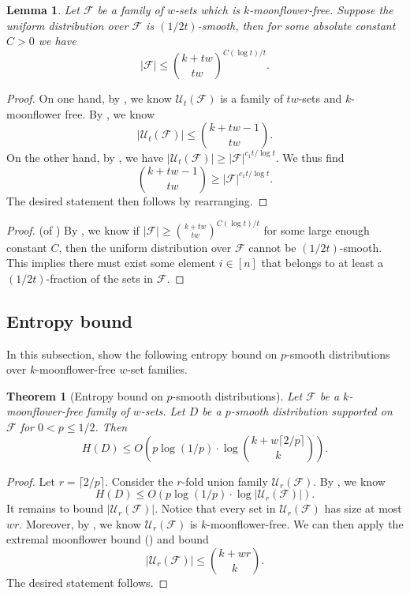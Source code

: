 \documentclass{article}
\newtheorem{theorem}{Theorem}[section]
\newtheorem{lemma}[lemma]{Lemma}
\newcommand{\<}{\langle}
\renewcommand{\>}{\rangle}
\newcommand{\calF}{\mathcal{F}}
\newcommand{\calU}{\mathcal{U}}
\begin{document}
\begin{lemma}\label{lem:smooth_uniform_implies_small_family_size}
    Let $\calF$ be a family of $w$-sets which is $k$-moonflower-free. Suppose the uniform distribution over $\calF$ is $(1/2t)$-smooth, then for some absolute constant $C>0$ we have 
    \[
    |\calF| \le {\binom{k+tw}{tw}}^{C (\log t)/t}.
    \]
\end{lemma}
\begin{proof}
    On one hand, by , we know $\calU_t(\calF)$ is a family of $tw$-sets and $k$-moonflower free. By , we know 
    \[
    |\calU_t (\calF)| \leq \binom{k+tw-1}{tw}.
    \] On the other hand, by , we have $|\calU_t (\calF)| \geq |\calF|^{c_1t / \log t}$. We thus find
    \[
    \binom{k+tw-1}{tw}  \geq |\calF|^{c_1t / \log t}.
    \]
    The desired statement then follows by rearranging.
\end{proof}

\begin{proof}
    (of ) By , we know if $|\calF| \ge {\binom{k+tw}{tw}}^{C (\log t)/t}$ for some large enough constant $C$, then the uniform distribution over $\calF$ cannot be $(1/2t)$-smooth. This implies there must exist some element $i \in [n]$ that belongs to at least a $(1/2t)$-fraction of the sets in $\calF$. 
\end{proof}

\subsection{Entropy bound}\label{subsec:universe_reduction}

In this subsection, show the following entropy bound on $p$-smooth distributions over $k$-moonflower-free $w$-set families.

\begin{theorem}[Entropy bound on $p$-smooth distributions]\label{thm:ent_bnd_p_smooth}
    Let $\calF$ be a $k$-moonflower-free family of $w$-sets. Let $D$ be a $p$-smooth distribution supported on $\calF$ for $0 < p \leq 1/2$. Then 
    \[
    H(D) \leq O\left( p \log (1/p) \cdot \log \binom{k+w \lceil 2/p \rceil}{k}\right).
    \]
\end{theorem}
\begin{proof}
    Let $r = \lceil 2/p \rceil$.
    Consider the $r$-fold union family $\calU_{r}(\calF)$. By , we know
    \[
    H(D) \leq  O ( p\log(1/p) \cdot \log |\calU_r (\calF)|).
    \]
    It remains to bound $|\calU_r (\calF)|$. Notice that every set in $\calU_r(\calF)$ has size at most $wr$. Moreover, by , we know $\calU_r (\calF)$ is $k$-moonflower-free. We can then apply the extremal moonflower bound () and bound
    \[
    |\calU_r (\calF)| \leq \binom{k+wr}{k}.
    \]
    The desired statement follows. 
\end{proof}
\end{document}
